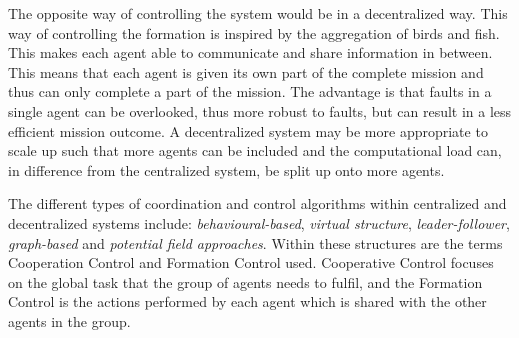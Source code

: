 The opposite way of controlling the system would be in a decentralized way. This way of controlling the formation is inspired by the aggregation of birds and fish. This makes each agent able to communicate and share information in between. This means that each agent is given its own part of the complete mission and thus can only complete a part of the mission. The advantage is that faults in a single agent can be overlooked, thus more robust to faults, but can result in a less efficient mission outcome. A decentralized system may be more appropriate to scale up such that more agents can be included and the computational load can, in difference from the centralized system, be split up onto more agents.

The different types of coordination and control algorithms within centralized and decentralized systems include: \textit{behavioural-based}, \textit{virtual structure}, \textit{leader-follower}, \textit{graph-based} and \textit{potential field approaches}. Within these structures are the terms Cooperation Control and Formation Control used. Cooperative Control focuses on the global task that the group of agents needs to fulfil, and the Formation Control is the actions performed by each agent which is shared with the other agents in the group. 
